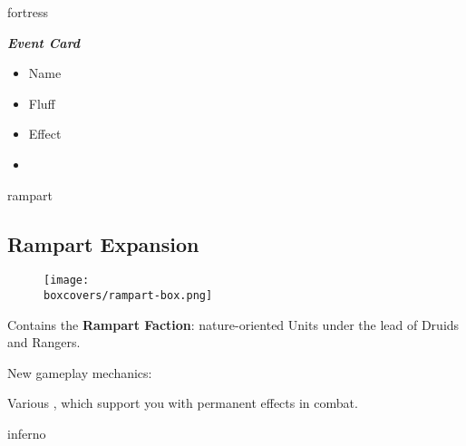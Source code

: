 \begin{multicols}{2}
\begin{expansion}[title=]{fortress}
  \begin{minipage}[h]{\linewidth}
    \vspace{0.1pt}
    \centering
    \begin{scriptsize}
    \end{scriptsize}
    \footnotesize
    \textbf{\textit{\textcolor{darkcandyapplered}{Event Card}}}
    \begin{multicols}{2}
      \begin{itemize}
        \item[\textbf{1.}] Name
        \item[\textbf{2.}] Fluff
        \item[\textbf{3.}] Effect
        \item[\textbf{\phantom{.}}] \phantom{.}
      \end{itemize}
    \end{multicols}
  \end{minipage}
\end{expansion}

\columnbreak
\begin{expansion}[title=]{rampart}
    \subsection*{\color{rampart}Rampart Expansion}
    \setlength\intextsep{0pt}
    \setlength\columnsep{0.8em}
    \begin{wrapfigure}{l}{0.35\textwidth}
        \texttt{[image: \\boxcovers/rampart-box.png]}
    \end{wrapfigure}
    Contains the \textbf{Rampart Faction}: nature-oriented Units under the lead of Druids and Rangers.\par
    \medskip
    New gameplay mechanics:\par
    \smallskip
    Various , which support you with permanent effects in combat.
\end{expansion}

\vspace*{1em}
\begin{expansion}[title=]{inferno}

\end{expansion}
\end{multicols}
